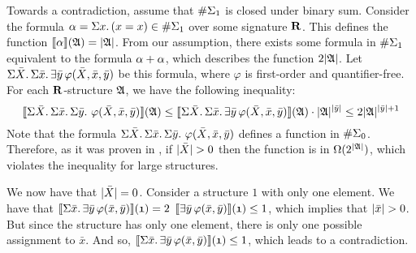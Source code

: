 Towards a contradiction, assume that $\#\Sigma_{1}$ is closed under binary sum. 
Consider the formula $\alpha = \Sigma{x}.\,(x = x) \in \#\Sigma_{1}$ over some signature $\mathbf{R}$. 
This defines the function ${\llbracket{}{\alpha}\rrbracket}(\mathfrak{A}) = \vert \mathfrak{A} \vert$. 
From our assumption, there exists some formula in $\#\Sigma_{1}$ equivalent to the formula $\alpha + \alpha$, which describes the function $2\vert \mathfrak{A} \vert$. 
Let $\Sigma{\bar{X}}.\,\Sigma{\bar{x}}.\,\exists\bar{y}\,\varphi(\bar{X},\bar{x},\bar{y})$ be this formula, where $\varphi$ is first-order and quantifier-free. 
For each $\mathbf{R}$-structure $\mathfrak{A}$, we have the following inequality:
$$
{\llbracket{}{\Sigma{\bar{X}}.\,\Sigma{\bar{x}}.\,\Sigma{\bar{y}}.\,\,\varphi(\bar{X},\bar{x},\bar{y})}\rrbracket}(\mathfrak{A})
\leq 
{\llbracket{}{\Sigma{\bar{X}}.\,\Sigma{\bar{x}}.\,\exists\bar{y}\,\varphi(\bar{X},\bar{x},\bar{y})}\rrbracket}(\mathfrak{A}) \cdot  \vert \mathfrak{A} \vert^{\vert \bar{y} \vert} \leq 2\vert \mathfrak{A} \vert^{\vert \bar{y} \vert+1} 
$$
Note that the formula $\Sigma{\bar{X}}.\,\Sigma{\bar{x}}.\,\Sigma{\bar{y}}.\,\,\varphi(\bar{X},\bar{x},\bar{y})$ defines a function in $\#\Sigma_{0}$. 
Therefore, as it was proven in \cite{SalujaST95}, if $\vert \bar{X} \vert > 0$ then the function is in $\Omega(2^{\vert \mathfrak{A} \vert})$, which violates the inequality for large structures.

We now have that $\vert \bar{X} \vert = 0$.
Consider a structure $\mathfrak{1}$ with only one element. We have that ${\llbracket{}{\Sigma{\bar{x}}.\,\exists\bar{y}\,\varphi(\bar{x},\bar{y})}\rrbracket}(\mathfrak{1}) = 2$ ${\llbracket{}{\exists\bar{y}\,\varphi(\bar{x},\bar{y})}\rrbracket}(\mathfrak{1}) \leq 1$, which implies that $\vert \bar{x} \vert > 0$. But since the structure has only one element, there is only one possible assignment to $\bar{x}$. 
And so, ${\llbracket{}{\Sigma{\bar{x}}.\,\exists\bar{y}\,\varphi(\bar{x},\bar{y})}\rrbracket}(\mathfrak{1}) \leq 1$, which leads to a contradiction.
